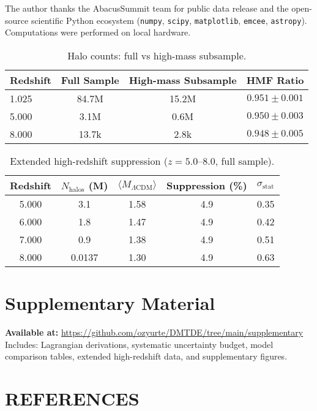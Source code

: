 \documentclass[aps,prd,twocolumn,superscriptaddress,nofootinbib,floatfix,preprintnumbers]{revtex4-2}
\begin{document}
\begin{acknowledgments}
The author thanks the AbacusSummit team for public data release and the open-source scientific Python ecosystem (\texttt{numpy}, \texttt{scipy}, \texttt{matplotlib}, \texttt{emcee}, \texttt{astropy}). Computations were performed on local hardware.
\end{acknowledgments}


\begin{table}[!htbp]
\caption{Halo counts: full vs high-mass subsample.}
\label{tab:halo_counts}
\centering
\begin{tabular}{lccc}
\toprule
Redshift & Full Sample & High-mass Subsample & HMF Ratio \\
\midrule
1.025 & 84.7M & 15.2M & $0.951 \pm 0.001$ \\
5.000 & 3.1M  & 0.6M  & $0.950 \pm 0.003$ \\
8.000 & 13.7k & 2.8k  & $0.948 \pm 0.005$ \\
\bottomrule
\end{tabular}
\end{table}

\begin{table}[!htbp]
\caption{Extended high-redshift suppression ($z=5.0$--$8.0$, full sample).}
\label{tab:highz_suppression}
\centering
\begin{tabular}{ccccc}
\toprule
Redshift & $N_{\mathrm{halos}}$ (M) & $\langle M_{\Lambda\mathrm{CDM}} \rangle$ & Suppression (\%) & $\sigma_{\mathrm{stat}}$ \\
\midrule
5.000 & 3.1 & 1.58 & 4.9 & 0.35 \\
6.000 & 1.8 & 1.47 & 4.9 & 0.42 \\
7.000 & 0.9 & 1.38 & 4.9 & 0.51 \\
8.000 & 0.0137 & 1.30 & 4.9 & 0.63 \\
\bottomrule
\end{tabular}
\end{table}

\section*{Supplementary Material}
\textbf{Available at:} \url{https://github.com/ozyurte/DMTDE/tree/main/supplementary} \\
Includes: Lagrangian derivations, systematic uncertainty budget, model comparison tables, extended high-redshift data, and supplementary figures.

\newpage
\onecolumngrid
\vspace*{1em}
{\centering\section*{REFERENCES}\par}
\vspace{0.5em}
\twocolumngrid



\end{document}
